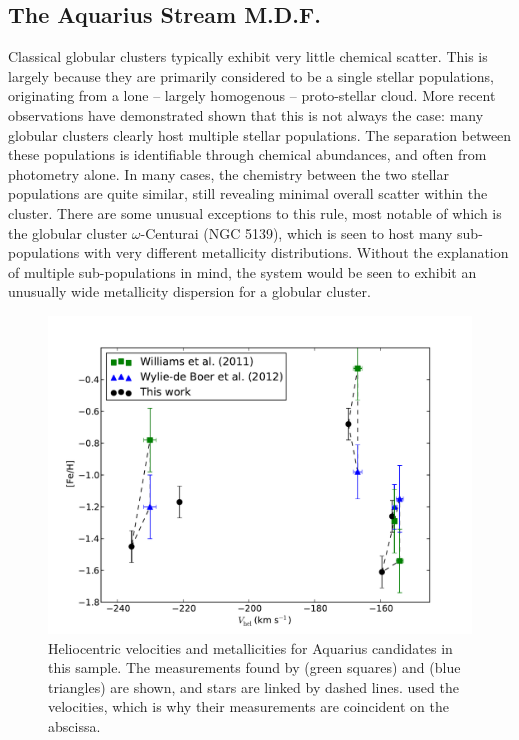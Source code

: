 \documentclass{emulateapj}
\begin{document}
\subsection{The Aquarius Stream M.D.F.}

Classical globular clusters typically exhibit very little chemical scatter. This is largely because they are primarily considered to be a single stellar populations, originating from a lone \--- largely homogenous \--- proto-stellar cloud. More recent observations have demonstrated shown that this is not always the case: many globular clusters clearly host multiple stellar populations. The separation between these populations is identifiable through chemical abundances, and often from photometry alone. In many cases, the chemistry between the two stellar populations are quite similar, still revealing minimal overall scatter within the cluster. There are some unusual exceptions to this rule, most notable of which is the globular cluster $\omega$-Centurai (NGC 5139), which is seen to host many sub-populations with very different metallicity distributions. Without the explanation of multiple sub-populations in mind, the system would be seen to exhibit an unusually wide metallicity dispersion for a globular cluster.

\begin{figure}[t!]
	\includegraphics[width=\textwidth]{./figures/aquarius-vhel-feh.pdf}
	\caption{Heliocentric velocities and metallicities for Aquarius candidates in this sample. The measurements found by \citet{williams;et-al_2011} (green squares) and \citet{wylie-de-boer;et-al_2012} (blue triangles) are shown, and stars are linked by dashed lines. \citet{wylie-de-boer;et-al_2012} used the \citet{williams;et-al_2011} velocities, which is why their measurements are coincident on the abscissa.}
	\label{fig:aquarius-vhel-feh}
\end{figure}
\end{document}
